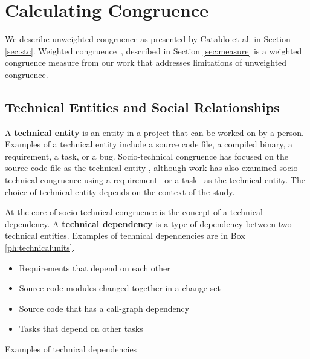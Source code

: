 


\section{Calculating Congruence}
\label{sec:congruence}

We describe unweighted congruence as presented by Cataldo et al. \cite{cataldo:cscw:2006} in Section \ref{sec:stc}. Weighted congruence~\cite{kwan2009:weighted}, described in Section \ref{sec:measure} is a weighted congruence measure from our work that addresses limitations of unweighted congruence.

\subsection{Technical Entities and Social Relationships}

A \textbf{technical entity} is an entity in a project that can be worked on by a person. Examples of a technical entity include a source code file, a compiled binary, a requirement, a task, or a bug. Socio-technical congruence has focused on the source code file as the technical entity \cite{cataldo:cscw:2006, ehrlich2008:gaps}, although work has also examined socio-technical congruence using a requirement~\cite{damian2010:rdc,marczak2009:crossfunctional} or a task~\cite{wolf:ieee:2009} as the technical entity. The choice of technical entity depends on the context of the study.

At the core of socio-technical congruence is the concept of a technical dependency. A \textbf{technical dependency} is a type of dependency between two technical entities. Examples of technical dependencies are in Box \ref{ph:technicalunits}.

\begin{placeholder}[t]
\begin{itemize}
\item Requirements that depend on each other~\cite{marczak:re:2008,marczak2009:crossfunctional}
\item Source code modules changed together in a change set~\cite{cataldo:cscw:2006,cataldo:esem:2008}
\item Source code that has a call-graph dependency~\cite{deSouza2004:thwarts_collaboration}
\item Tasks that depend on other tasks \cite{wolf:ieee:2009}
\end{itemize}

\caption{Examples of technical dependencies}
\label{ph:technicalunits}
\end{placeholder}


